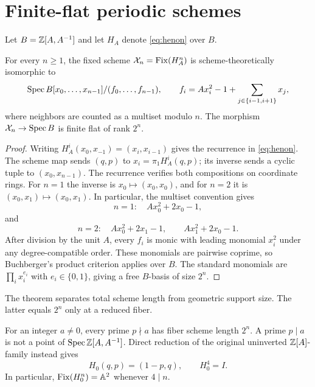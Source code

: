 \section{Finite-flat periodic schemes}

Let $B=\mathbb Z[A,A^{-1}]$ and let $H_A$ denote \eqref{eq:henon} over $B$.

\begin{theorem}\label{thm:flat}
For every $n\geq1$, the fixed scheme $\mathcal X_n=\operatorname{Fix}(H_A^n)$ is
scheme-theoretically isomorphic to
\begin{equation}\label{eq:cyclicscheme}
 \operatorname{Spec} B[x_0,\ldots,x_{n-1}]/(f_0,\ldots,f_{n-1}),
 \qquad
 f_i=A x_i^2-1+\sum_{j\in\{i-1,i+1\}}x_j,
\end{equation}
where neighbors are counted as a multiset modulo $n$.  The morphism
$\mathcal X_n\to\operatorname{Spec} B$ is finite flat of rank $2^n$.
\end{theorem}

\begin{proof}
Writing $H_A^i(x_0,x_{-1})=(x_i,x_{i-1})$ gives the recurrence in
\eqref{eq:henon}.  The scheme map sends $(q,p)$ to
$x_i=\pi_1H_A^i(q,p)$; its inverse sends a cyclic tuple to
$(x_0,x_{n-1})$.  The recurrence verifies both compositions on coordinate
rings.  For $n=1$ the inverse is $x_0\mapsto(x_0,x_0)$, and for $n=2$ it is
$(x_0,x_1)\mapsto(x_0,x_1)$.  In particular, the multiset convention gives
\[
 n=1:\quad Ax_0^2+2x_0-1,
\]
and
\[
 n=2:\quad Ax_0^2+2x_1-1,\qquad Ax_1^2+2x_0-1.
\]
After division by the unit $A$, every $f_i$ is monic with leading monomial
$x_i^2$ under any degree-compatible order.  These monomials are pairwise
coprime, so Buchberger's product criterion applies over $B$.  The standard
monomials are $\prod_i x_i^{e_i}$ with $e_i\in\{0,1\}$, giving a free
$B$-basis of size $2^n$.
\end{proof}

The theorem separates total scheme length from geometric support size.  The
latter equals $2^n$ only at a reduced fiber.

\begin{proposition}\label{prop:degree-drop}
For an integer $a\ne0$, every prime $p\nmid a$ has fiber scheme length $2^n$.
A prime $p\mid a$ is not a point of
$\operatorname{Spec}\mathbb Z[A,A^{-1}]$.  Direct reduction of the original uninverted
$\mathbb Z[A]$-family instead gives
\[
 H_0(q,p)=(1-p,q),\qquad H_0^4=I.
\]
In particular, $\operatorname{Fix}(H_0^n)=\mathbb A^2$ whenever $4\mid n$.
\end{proposition}

